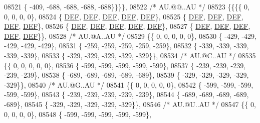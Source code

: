 \begin{DoxyCode}
08521 \{ -409, -688, -688, -688, -688\}\}\}\},
08522 \textcolor{comment}{/* AU.@@..AU */}
08523 \{\{\{\{    0,    0,    0,    0,    0\},
08524 \{  \mbox{\hyperlink{1_88_84__epars_8h_a397419fc12b37ed479c8abb9d444d843}{DEF}},  \mbox{\hyperlink{1_88_84__epars_8h_a397419fc12b37ed479c8abb9d444d843}{DEF}},  \mbox{\hyperlink{1_88_84__epars_8h_a397419fc12b37ed479c8abb9d444d843}{DEF}},  \mbox{\hyperlink{1_88_84__epars_8h_a397419fc12b37ed479c8abb9d444d843}{DEF}},  \mbox{\hyperlink{1_88_84__epars_8h_a397419fc12b37ed479c8abb9d444d843}{DEF}}\},
08525 \{  \mbox{\hyperlink{1_88_84__epars_8h_a397419fc12b37ed479c8abb9d444d843}{DEF}},  \mbox{\hyperlink{1_88_84__epars_8h_a397419fc12b37ed479c8abb9d444d843}{DEF}},  \mbox{\hyperlink{1_88_84__epars_8h_a397419fc12b37ed479c8abb9d444d843}{DEF}},  \mbox{\hyperlink{1_88_84__epars_8h_a397419fc12b37ed479c8abb9d444d843}{DEF}},  \mbox{\hyperlink{1_88_84__epars_8h_a397419fc12b37ed479c8abb9d444d843}{DEF}}\},
08526 \{  \mbox{\hyperlink{1_88_84__epars_8h_a397419fc12b37ed479c8abb9d444d843}{DEF}},  \mbox{\hyperlink{1_88_84__epars_8h_a397419fc12b37ed479c8abb9d444d843}{DEF}},  \mbox{\hyperlink{1_88_84__epars_8h_a397419fc12b37ed479c8abb9d444d843}{DEF}},  \mbox{\hyperlink{1_88_84__epars_8h_a397419fc12b37ed479c8abb9d444d843}{DEF}},  \mbox{\hyperlink{1_88_84__epars_8h_a397419fc12b37ed479c8abb9d444d843}{DEF}}\},
08527 \{  \mbox{\hyperlink{1_88_84__epars_8h_a397419fc12b37ed479c8abb9d444d843}{DEF}},  \mbox{\hyperlink{1_88_84__epars_8h_a397419fc12b37ed479c8abb9d444d843}{DEF}},  \mbox{\hyperlink{1_88_84__epars_8h_a397419fc12b37ed479c8abb9d444d843}{DEF}},  \mbox{\hyperlink{1_88_84__epars_8h_a397419fc12b37ed479c8abb9d444d843}{DEF}},  \mbox{\hyperlink{1_88_84__epars_8h_a397419fc12b37ed479c8abb9d444d843}{DEF}}\}\},
08528 \textcolor{comment}{/* AU.@A..AU */}
08529 \{\{    0,    0,    0,    0,    0\},
08530 \{ -429, -429, -429, -429, -429\},
08531 \{ -259, -259, -259, -259, -259\},
08532 \{ -339, -339, -339, -339, -339\},
08533 \{ -329, -329, -329, -329, -329\}\},
08534 \textcolor{comment}{/* AU.@C..AU */}
08535 \{\{    0,    0,    0,    0,    0\},
08536 \{ -599, -599, -599, -599, -599\},
08537 \{ -239, -239, -239, -239, -239\},
08538 \{ -689, -689, -689, -689, -689\},
08539 \{ -329, -329, -329, -329, -329\}\},
08540 \textcolor{comment}{/* AU.@G..AU */}
08541 \{\{    0,    0,    0,    0,    0\},
08542 \{ -599, -599, -599, -599, -599\},
08543 \{ -239, -239, -239, -239, -239\},
08544 \{ -689, -689, -689, -689, -689\},
08545 \{ -329, -329, -329, -329, -329\}\},
08546 \textcolor{comment}{/* AU.@U..AU */}
08547 \{\{    0,    0,    0,    0,    0\},
08548 \{ -599, -599, -599, -599, -599\},

\end{DoxyCode}
